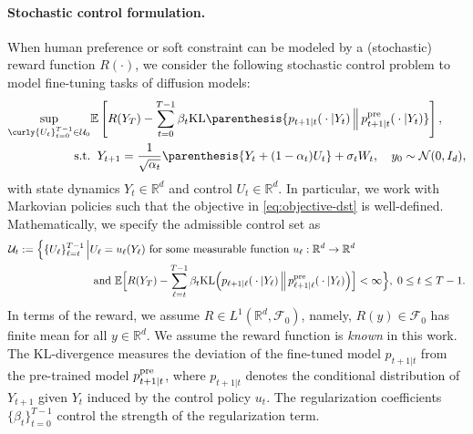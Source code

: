 \documentclass{article}
\begin{document}
\paragraph{Stochastic control formulation.}
When human preference or soft constraint can be modeled by a (stochastic) reward function $R(\cdot)$, we consider the following  stochastic control problem to model fine-tuning tasks of diffusion models:
\begin{eqnarray}
    \sup_{\curly{U_t}_{t = 0}^{T-1}\in \mathcal{U}_0} &  \mathbb{E}\left[R(Y_T) - \sum_{t = 0}^{T-1}\beta_t{\rm KL}\parenthesis{p_{t+1\vert t} ({}\cdot{}|Y_t)\,\Big\|\,p_{t+1\vert t}^{\rm pre}({}\cdot{}|Y_t)}\right], \label{eq:objective-dst} \\ 
    \text{s.t.} & \;\; 
    Y_{t+1} = \frac{1}{\sqrt{\alpha_t}}\parenthesis{Y_t + (1 - \alpha_t)U_t} + \sigma_t W_t,\quad y_{0} \sim \mathcal{N}(0, I_{d}), \label{eq:dynamics-dst}
\end{eqnarray}
   with state dynamics $Y_t\in \mathbb{R}^d$ and control $U_t\in \mathbb{R}^d$. In particular, we work with Markovian policies such that the objective in \eqref{eq:objective-dst} is well-defined. Mathematically, we specify the admissible control set as 
   \begin{align*}
    \mathcal{U}_{t}:=\Big\{\{U_\ell\}_{\ell=t}^{T-1} \,\Big|& U_\ell = {u_\ell(Y_\ell)} \text{ for some measurable function } u_\ell: \mathbb{R}^d\rightarrow \mathbb{R}^d \\
    & \text{ and }\mathbb{E}\Big[R(Y_T) - \sum_{\ell = t}^{T-1}\beta_t{\rm KL}\Big(p_{\ell+1\vert \ell} ({}\cdot{}|Y_\ell)\,\Big\|\,p_{\ell+1\vert \ell}^{\rm pre}({}\cdot{}|Y_\ell)\Big)\Big]<\infty\Big\}, \; 0 \leq t \leq T-1.
   \end{align*}
In terms of the reward, we assume $R\in L^1(\mathbb{R}^d,\mathcal{F}_0)$, namely, $R(y)\in \mathcal{F}_0$ has finite mean for all $y\in \mathbb{R}^d$.
%
   We assume the reward function is {\it known} in this work.
   The KL-divergence measures the deviation of the fine-tuned model $p_{t+1\vert t}$ from the pre-trained model $p_{t+1\vert t}^{\rm pre}$, where $ p_{t+1 \vert t} $ denotes the conditional distribution of $ Y_{t+1} $ given $ Y_{t} $ induced by the control policy $u_t$. The regularization coefficients $\{\beta_t\}_{t=0}^{T-1}$ control the strength of the regularization term.  
\end{document}
